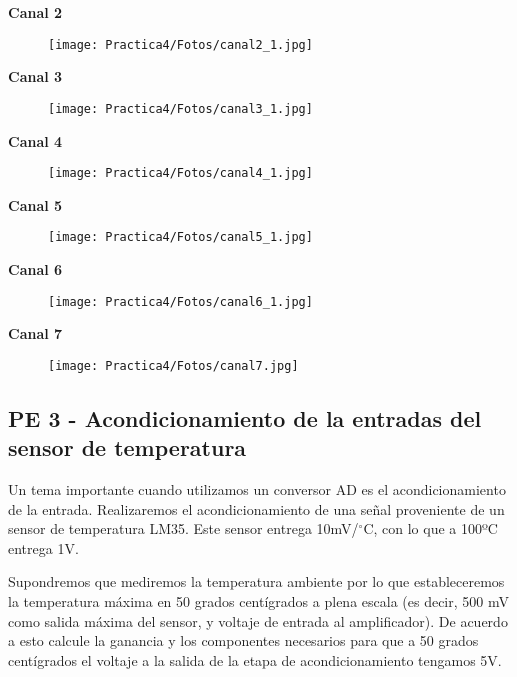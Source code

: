 \documentclass[12pt]{article}
\begin{document}
    \textbf{Canal 2}
    \begin{figure}[h!]
                \centering
                \texttt{[image: Practica4/Fotos/canal2\_1.jpg]}
    \end{figure}
    
    \newpage
    \textbf{Canal 3}
    \begin{figure}[h!]
                \centering
                \texttt{[image: Practica4/Fotos/canal3\_1.jpg]}
    \end{figure}
    
    \textbf{Canal 4}
    \begin{figure}[h!]
                \centering
                \texttt{[image: Practica4/Fotos/canal4\_1.jpg]}
    \end{figure}
    
    \newpage
    \textbf{Canal 5}
    \begin{figure}[h!]
                \centering
                \texttt{[image: Practica4/Fotos/canal5\_1.jpg]}
    \end{figure}
    
    \textbf{Canal 6}
    \begin{figure}[h!]
                \centering
                \texttt{[image: Practica4/Fotos/canal6\_1.jpg]}
    \end{figure}
    
    \newpage
    \textbf{Canal 7}
    \begin{figure}[h!]
                \centering
                \texttt{[image: Practica4/Fotos/canal7.jpg]}
    \end{figure}
    

	\subsection{PE 3 - Acondicionamiento de la entradas del sensor de temperatura}
	Un tema importante cuando utilizamos un conversor AD es el acondicionamiento de la entrada. Realizaremos el acondicionamiento de una señal proveniente de un sensor de temperatura LM35. Este sensor entrega 10mV/$^{\circ}$C, con lo que a 100ºC entrega 1V.

    Supondremos que mediremos la temperatura ambiente por lo que estableceremos la temperatura máxima en 50 grados centígrados a plena escala (es decir, 500 mV como salida máxima del sensor, y voltaje de entrada al amplificador). De acuerdo a esto calcule la ganancia y los componentes necesarios para que a 50 grados centígrados el voltaje a la salida de la etapa de acondicionamiento tengamos 5V.
    
\end{document}
